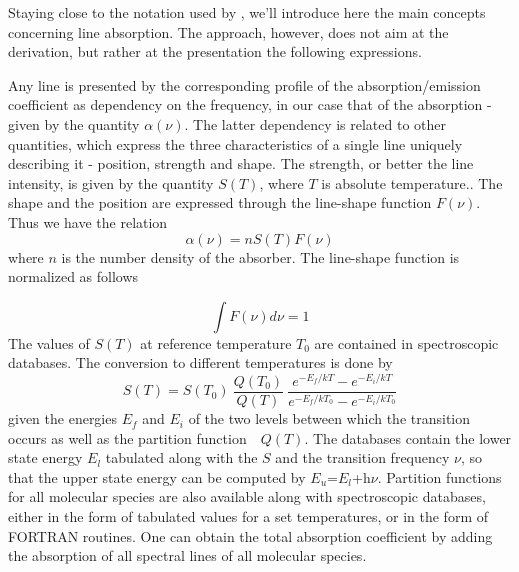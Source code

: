 
\label{sec:line_absorption}

 
Staying close to the notation used by \citet{goodyandyung:89}, we'll introduce here the main concepts concerning
line absorption. The approach, however, does not aim  at the
derivation, but rather at the presentation the following expressions.

Any line is presented by the corresponding profile of the absorption/emission
coefficient as dependency on the frequency, in our case that of the
absorption - given by the quantity $\alpha(\nu)$. The latter dependency
is related to other quantities, which express the three
characteristics of a single line uniquely describing it - position,
strength and shape. 
The strength, or better the line intensity, is given by the quantity
$S(T)$, where $T$ is absolute temperature.. The shape and the position are expressed through the
line-shape function $F(\nu)$. Thus we have the relation    
\begin{equation}
  \alpha(\nu)=nS(T)F(\nu)
\end{equation} 
where $n$ is the number density of the absorber. The line-shape
function is normalized as follows

\begin{equation}
  \int F(\nu)d\nu=1
\end{equation}
The values of $S(T)$ at reference temperature $T_0$ are contained in spectroscopic databases. The conversion to different
temperatures is done by
\begin{equation}
S(T)=S(T_0)~\frac{Q(T_0)}{Q(T)}~\frac{e^{-E_f/kT} - e^{-E_i/kT}}{e^{-E_f/kT_0} - e^{-E_i/kT_0}}
\label{}
\end{equation}
given the energies $E_f$ and $E_i$ of the two levels between which the
transition occurs as well as the partition function~~$Q(T)$. The
databases contain the lower state energy $E_l$ tabulated along with the
$S$ and the transition frequency $\nu$, so that the upper state energy can be
computed by $E_u$=$E_l$+h$\nu$. Partition functions for all molecular species are also
available along with spectroscopic databases, either in the form of tabulated values for a set
temperatures, or in the form of FORTRAN routines. One can obtain the total absorption
coefficient by adding the absorption of all spectral lines of all
molecular species.

